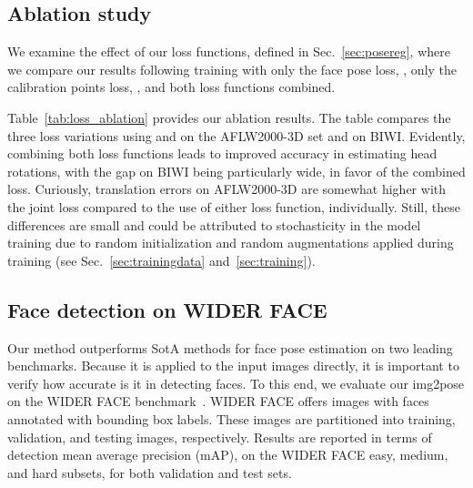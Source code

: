 \documentclass[final]{cvpr}
\begin{document}
\begin{table}[b]
    \centering
    \caption{Comparison of the effects of different loss functions on the pose estimation results obtained on the AFLW2000-3D and BIWI benchmarks.}
    \label{tab:loss_ablation}
\end{table}

\subsection{Ablation study}\label{sec:append:ablation}
We examine the effect of our loss functions, defined in Sec.~\ref{sec:posereg}, where we compare our results following training with only the face pose loss, , only the calibration points loss, , and both loss functions combined.

Table~\ref{tab:loss_ablation} provides our ablation results. The table compares the three loss variations using  and  on the AFLW2000-3D set and  on BIWI. Evidently, combining both loss functions leads to improved accuracy in estimating head rotations, with the gap on BIWI being particularly wide, in favor of the combined loss. Curiously, translation errors on AFLW2000-3D are somewhat higher with the joint loss compared to the use of either loss function, individually. Still, these differences are small and could be attributed to stochasticity in the model training due to random initialization and random augmentations applied during training (see Sec.~\ref{sec:trainingdata} and~\ref{sec:training}).




\subsection{Face detection on WIDER FACE}\label{sec:WIDER}
Our method outperforms SotA methods for face pose estimation on two leading benchmarks. Because it is applied to the input images directly, it is important to verify how accurate is it in detecting faces. To this end, we evaluate our img2pose on the WIDER FACE benchmark~\cite{wider_face}. WIDER FACE offers  images with  faces annotated with bounding box labels. These images are partitioned into  training,  validation, and  testing images, respectively. Results are reported in terms of detection mean average precision (mAP), on the WIDER FACE easy, medium, and hard subsets, for both validation and test sets.
\end{document}
